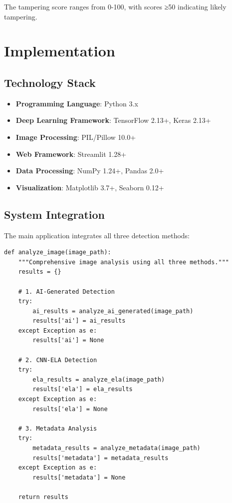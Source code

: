 \documentclass[12pt,a4paper]{article}
\begin{document}
The tampering score ranges from 0-100, with scores ≥50 indicating likely tampering.

\section{Implementation}

\subsection{Technology Stack}
\begin{itemize}
    \item \textbf{Programming Language}: Python 3.x
    \item \textbf{Deep Learning Framework}: TensorFlow 2.13+, Keras 2.13+
    \item \textbf{Image Processing}: PIL/Pillow 10.0+
    \item \textbf{Web Framework}: Streamlit 1.28+
    \item \textbf{Data Processing}: NumPy 1.24+, Pandas 2.0+
    \item \textbf{Visualization}: Matplotlib 3.7+, Seaborn 0.12+
\end{itemize}

\subsection{System Integration}
The main application integrates all three detection methods:

\begin{lstlisting}[caption=Main Analysis Function]
def analyze_image(image_path):
    """Comprehensive image analysis using all three methods."""
    results = {}
    
    # 1. AI-Generated Detection
    try:
        ai_results = analyze_ai_generated(image_path)
        results['ai'] = ai_results
    except Exception as e:
        results['ai'] = None
    
    # 2. CNN-ELA Detection
    try:
        ela_results = analyze_ela(image_path)
        results['ela'] = ela_results
    except Exception as e:
        results['ela'] = None
    
    # 3. Metadata Analysis
    try:
        metadata_results = analyze_metadata(image_path)
        results['metadata'] = metadata_results
    except Exception as e:
        results['metadata'] = None
    
    return results
\end{lstlisting}
\end{document}
